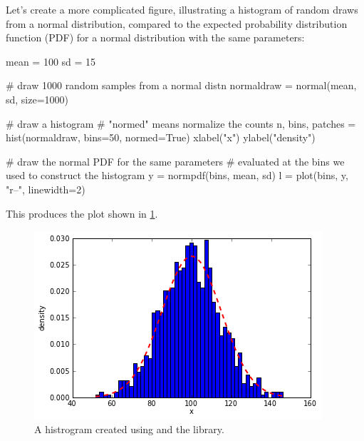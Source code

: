 Let's create a more complicated figure, illustrating a histogram of random draws from a normal distribution, compared to the expected probability distribution function (PDF) for a normal distribution with the same parameters:
\begin{python}
mean = 100
sd = 15

# draw 1000 random samples from a normal distn
normaldraw = normal(mean, sd, size=1000)

# draw a histogram
# "normed" means normalize the counts
n, bins, patches = hist(normaldraw, bins=50, normed=True)
xlabel("x")
ylabel("density")

# draw the normal PDF for the same parameters
# evaluated at the bins we used to construct the histogram
y = normpdf(bins, mean, sd)
l = plot(bins, y, "r--", linewidth=2)    
\end{python}
%
This produces the plot shown in \cref{fig:histexample}.
\begin{figure}[!ht]
    \centering
    \includegraphics[width=0.5\columnwidth]{./figures/hands-on8/fig-histexample.png}
    \caption{A histrogram created using \ipy and the \matplotlib library.}\label{fig:histexample}
\end{figure}

